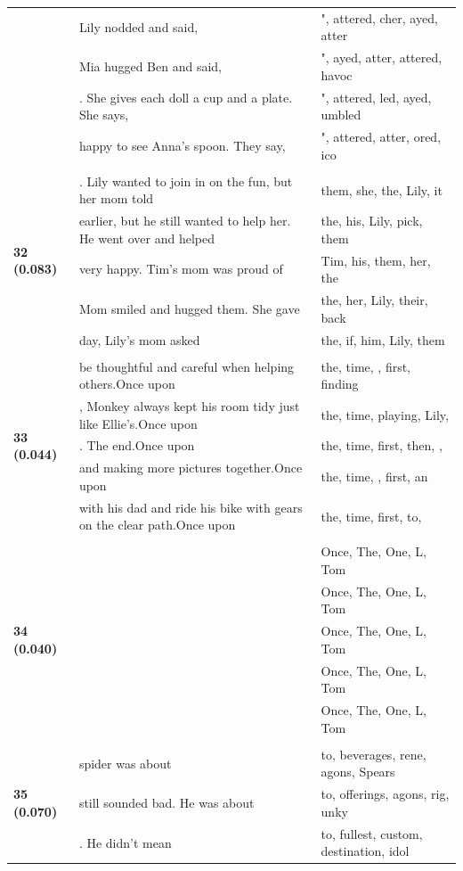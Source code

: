 \documentclass{article}
\theoremstyle{plain}
\theoremstyle{definition}
\theoremstyle{remark}
\begin{document}
\begin{longtable}{|p{}|p{}|p{}|}
& Lily nodded and said, & ", attered, cher, ayed, atter \\
& Mia hugged Ben and said, & ", ayed, atter, attered,  havoc \\
& . She gives each doll a cup and a plate. She says, & ", attered, led, ayed, umbled \\
& happy to see Anna's spoon. They say, & ", attered, atter, ored, ico \\
& & \\
\multirow{5}{*}{\textbf{32 (0.083)}} & . Lily wanted to join in on the fun, but her mom told & them,  she,  the,  Lily,  it \\
& earlier, but he still wanted to help her. He went over and helped & the,  his,  Lily,  pick,  them \\
& very happy. Tim's mom was proud of & Tim,  his,  them,  her,  the \\
& Mom smiled and hugged them. She gave & the,  her,  Lily,  their,  back \\
& day, Lily's mom asked & the,  if,  him,  Lily,  them \\
& & \\
\multirow{5}{*}{\textbf{33 (0.044)}} & be thoughtful and careful when helping others.Once upon & the,  time,  ,  first,  finding \\
& , Monkey always kept his room tidy just like Ellie's.Once upon & the,  time,  playing,  Lily, \\
& . The end.Once upon & the,  time,  first,  then, , \\
& and making more pictures together.Once upon & the,  time,  ,  first,  an \\
& with his dad and ride his bike with gears on the clear path.Once upon & the,  time,  first,  to, \\
& & \\
\multirow{5}{*}{\textbf{34 (0.040)}} &  & Once, The, One, L, Tom \\
&  & Once, The, One, L, Tom \\
&  & Once, The, One, L, Tom \\
&  & Once, The, One, L, Tom \\
&  & Once, The, One, L, Tom \\
& & \\
\multirow{5}{*}{\textbf{35 (0.070)}} & spider was about & to,  beverages, rene, agons,  Spears \\
& still sounded bad. He was about & to,  offerings, agons, rig, unky \\
& . He didn't mean & to,  fullest,  custom,  destination,  idol \\

\end{longtable}
\end{document}

